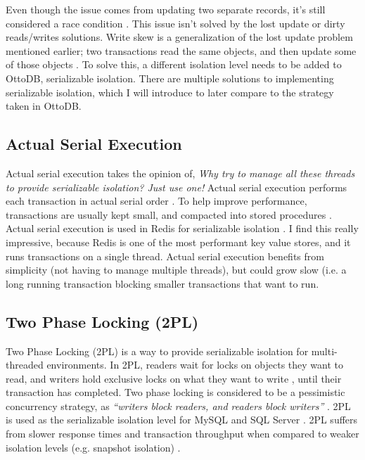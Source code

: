 \documentclass[conference]{IEEEtran}
\begin{document}
    Even though the issue comes from updating two separate records, it's still considered a race condition \cite[p. 247]{b18}. This issue isn't solved by the lost update or dirty reads/writes solutions. Write skew is a generalization of the lost update problem mentioned earlier; two transactions read the same objects, and then update some of those objects \cite[p. 248]{b18}. To solve this, a different isolation level needs to be added to OttoDB, serializable isolation. There are multiple solutions to implementing serializable isolation, which I will introduce to later compare to the strategy taken in OttoDB.

    \subsection{Actual Serial Execution}

    Actual serial execution takes the opinion of, \textit{Why try to manage all these threads to provide serializable isolation? Just use one!} Actual serial execution performs each transaction in actual serial order \cite[p. 253]{b18}. To help improve performance, transactions are usually kept small, and compacted into stored procedures \cite[p. 253]{b18}. Actual serial execution is used in Redis for serializable isolation \cite[p. 253]{b18}. I find this really impressive, because Redis is one of the most performant key value stores, and it runs transactions on a single thread. Actual serial execution benefits from simplicity (not having to manage multiple threads), but could grow slow (i.e. a long running transaction blocking smaller transactions that want to run.

    \subsection{Two Phase Locking (2PL)}

    Two Phase Locking (2PL) is a way to provide serializable isolation for multi-threaded environments. In 2PL, readers wait for locks on objects they want to read, and writers hold exclusive locks on what they want to write \cite[p. 257]{b18}, until their transaction has completed. Two phase locking is considered to be a pessimistic concurrency strategy, as \textit{“writers block readers, and readers block writers”} \cite[p. 257]{b18}. 2PL is used as the serializable isolation level for MySQL and SQL Server \cite[p. 257]{b18}. 2PL suffers from slower response times and transaction throughput when compared to weaker isolation levels (e.g. snapshot isolation) \cite[p. 258]{b18}.
\end{document}
